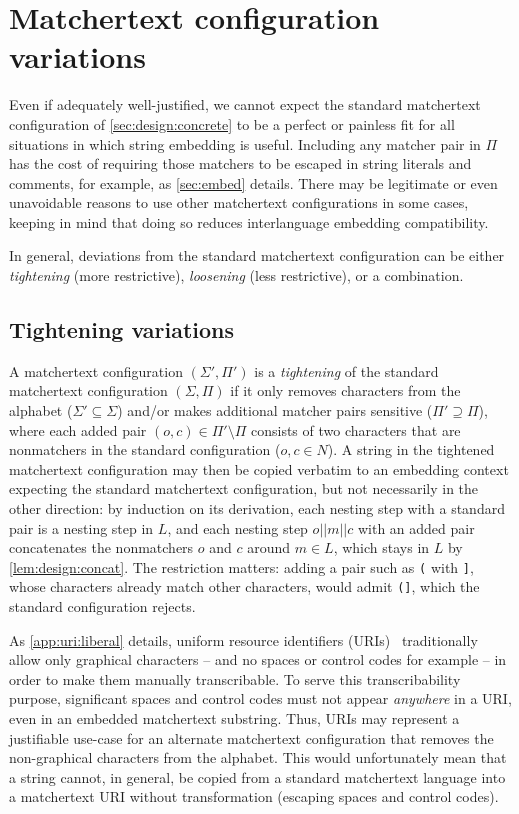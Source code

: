 \section{Matchertext configuration variations}
\label{app:concrete:variations}

Even if adequately well-justified,
we cannot expect the standard matchertext configuration
of \cref{sec:design:concrete} to be a perfect or painless fit
for all situations in which string embedding is useful.
Including any matcher pair in $\Pi$ has the cost
of requiring those matchers to be escaped
in string literals and comments, for example,
as \cref{sec:embed} details.
There may be legitimate or even unavoidable reasons
to use other matchertext configurations in some cases,
keeping in mind that doing so reduces interlanguage embedding compatibility.

In general, deviations from the standard matchertext configuration
can be either \emph{tightening} (more restrictive),
\emph{loosening} (less restrictive), or a combination.

\subsection{Tightening variations}
\label{app:concrete:variations:tight}

A matchertext configuration $(\Sigma',\Pi')$
is a \emph{tightening} of
the standard matchertext configuration $(\Sigma,\Pi)$
if it only removes characters from the alphabet ($\Sigma' \subseteq \Sigma$)
and/or makes additional matcher pairs sensitive ($\Pi' \supseteq \Pi$),
where each added pair $(o,c) \in \Pi' \setminus \Pi$
consists of two characters that are nonmatchers in the standard configuration
($o, c \in N$).
A string in the tightened matchertext configuration
may then be copied verbatim to an embedding context
expecting the standard matchertext configuration,
but not necessarily in the other direction:
by induction on its derivation,
each nesting step with a standard pair is a nesting step in $L$,
and each nesting step $o||m||c$ with an added pair
concatenates the nonmatchers $o$ and $c$ around $m \in L$,
which stays in $L$ by \cref{lem:design:concat}.
The restriction matters:
adding a pair such as \verb|(| with \verb|]|,
whose characters already match other characters,
would admit \verb|(]|, which the standard configuration rejects.

As \cref{app:uri:liberal} details,
uniform resource identifiers (URIs)~\cite{rfc3986} traditionally allow
only graphical characters -- and no spaces or control codes for example --
in order to make them manually transcribable.
To serve this transcribability purpose,
significant spaces and control codes must not appear \emph{anywhere} in a URI,
even in an embedded matchertext substring.
Thus, URIs may represent a justifiable use-case
for an alternate matchertext configuration that removes
the non-graphical characters from the alphabet.
This would unfortunately mean that a string cannot, in general,
be copied from a standard matchertext language into a matchertext URI
without transformation (\ie escaping spaces and control codes).

